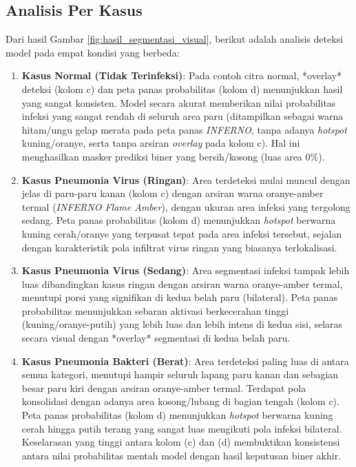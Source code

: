 \documentclass[12pt,a4paper,oneside]{book}
\begin{document}
\subsection{Analisis Per Kasus}

Dari hasil Gambar \ref{fig:hasil_segmentasi_visual}, berikut adalah analisis deteksi model pada empat kondisi yang berbeda:

\begin{enumerate}
  \item \textbf{Kasus Normal (Tidak Terinfeksi)}: Pada contoh citra normal, *overlay* deteksi (kolom c) dan peta panas probabilitas (kolom d) menunjukkan hasil yang sangat konsisten. Model secara akurat memberikan nilai probabilitas infeksi yang sangat rendah di seluruh area paru (ditampilkan sebagai warna hitam/ungu gelap merata pada peta panas \textit{INFERNO}, tanpa adanya \textit{hotspot} kuning/oranye, serta tanpa arsiran \textit{overlay} pada kolom c). Hal ini menghasilkan masker prediksi biner yang bersih/kosong (luas area 0\%).
  \item \textbf{Kasus Pneumonia Virus (Ringan)}: Area terdeteksi mulai muncul dengan jelas di paru-paru kanan (kolom c) dengan arsiran warna oranye-amber termal (\textit{INFERNO Flame Amber}), dengan ukuran area infeksi yang tergolong sedang. Peta panas probabilitas (kolom d) menunjukkan \textit{hotspot} berwarna kuning cerah/oranye yang terpusat tepat pada area infeksi tersebut, sejalan dengan karakteristik pola infiltrat virus ringan yang biasanya terlokalisasi.
  \item \textbf{Kasus Pneumonia Virus (Sedang)}: Area segmentasi infeksi tampak lebih luas dibandingkan kasus ringan dengan arsiran warna oranye-amber termal, menutupi porsi yang signifikan di kedua belah paru (bilateral). Peta panas probabilitas menunjukkan sebaran aktivasi berkecerahan tinggi (kuning/oranye-putih) yang lebih luas dan lebih intens di kedua sisi, selaras secara visual dengan *overlay* segmentasi di kedua belah paru.
  \item \textbf{Kasus Pneumonia Bakteri (Berat)}: Area terdeteksi paling luas di antara semua kategori, menutupi hampir seluruh lapang paru kanan dan sebagian besar paru kiri dengan arsiran oranye-amber termal. Terdapat pola konsolidasi dengan adanya area kosong/lubang di bagian tengah (kolom c). Peta panas probabilitas (kolom d) menunjukkan \textit{hotspot} berwarna kuning cerah hingga putih terang yang sangat luas mengikuti pola infeksi bilateral. Keselarasan yang tinggi antara kolom (c) dan (d) membuktikan konsistensi antara nilai probabilitas mentah model dengan hasil keputusan biner akhir.
\end{enumerate}
\end{document}
